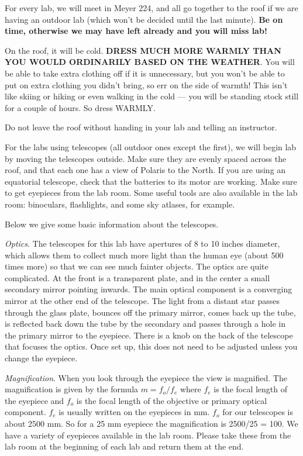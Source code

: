 
\noindent For every lab, we will meet in Meyer 224, and all
go together to the roof if we are having an outdoor lab (which won't
be decided until the last minute). {\bf Be on time, otherwise we may
have left already and you will miss lab!}

\medskip \noindent On the roof, it will be cold. {\bf DRESS MUCH MORE
WARMLY THAN YOU WOULD ORDINARILY BASED ON THE WEATHER}. You will be
able to take extra clothing off if it is unnecessary, but you won't be
able to put on extra clothing you didn't bring, so err on the side of
warmth!  This isn't like skiing or hiking or even walking in the cold
--- you will be standing stock still for a couple of hours. So dress
WARMLY.

\medskip \noindent Do not leave the roof without handing in your lab
and telling an instructor.

\medskip \noindent For the labs using telescopes (all outdoor ones
except the first), we will begin lab by moving the telescopes outside.
Make sure they are evenly spaced across the roof, and that each one
has a view of Polaris to the North. If you are using an equatorial
telescope, check that the batteries to its motor are working. Make
sure to get eyepieces from the lab room. Some useful tools are also
available in the lab room: binoculars, flashlights, and some sky
atlases, for example. 

\medskip
\noindent
Below we give some basic information about the telescopes. 

\medskip
\noindent
\emph{Optics}. The telescopes for this lab have apertures of 8 to 10
inches diameter, which allows them to collect much more light than the
human eye (about 500 times more) so that we can see much fainter
objects.  The optics are quite complicated. At the front is a
transparent plate, and in the center a small secondary mirror pointing
inwards. The main optical component is a converging mirror at the
other end of the telescope. The light from a distant star passes
through the glass plate, bounces off the primary mirror, comes back up
the tube, is reflected back down the tube by the secondary and passes
through a hole in the primary mirror to the eyepiece.  There is a knob
on the back of the telescope that focuses the optics. Once set up,
this does not need to be adjusted unless you change the eyepiece.

\medskip \noindent \emph{Magnification}. When you look through the
eyepiece the view is magnified.  The magnification is given by the
formula $m = f_o/f_e$ where $f_e$ is the focal length of the eyepiece
and $f_o$ is the focal length of the objective or primary optical
component. $f_e$ is usually written on the eyepieces in mm. $f_o$ for
our telescopes is about 2500 mm. So for a 25 mm eyepiece the
magnification is 2500/25 = 100. We have a variety of eyepieces
available in the lab room. Please take these from the lab room at the
beginning of each lab and return them at the end.

